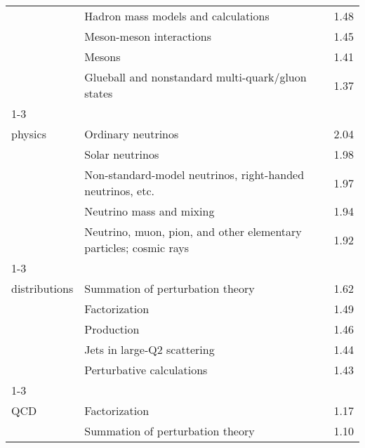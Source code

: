 \begin{longtable}[H]{p{}|p{}|p{}}
                                                               & Hadron mass models and calculations &  1.48 \\
                                                               & Meson-meson interactions &  1.45 \\
                                                               & Mesons &  1.41 \\
                                                               & Glueball and nonstandard multi-quark/gluon states &  1.37 \\
\cline{1-3}
\multirow{5}{*}{\begin{tabular}{l}Neutrino\\ physics\end{tabular}} & Ordinary neutrinos &  2.04 \\
                                                               & Solar neutrinos &  1.98 \\
                                                               & Non-standard-model neutrinos, right-handed neutrinos, etc. &  1.97 \\
                                                               & Neutrino mass and mixing &  1.94 \\
                                                               & Neutrino, muon, pion, and other elementary particles; cosmic rays &  1.92 \\
\cline{1-3}
\multirow{5}{*}{\begin{tabular}{l}Partons\\ distributions\end{tabular}} & Summation of perturbation theory &  1.62 \\
                                                               & Factorization &  1.49 \\
                                                               & Production &  1.46 \\
                                                               & Jets in large-Q2 scattering &  1.44 \\
                                                               & Perturbative calculations &  1.43 \\
\cline{1-3}
\multirow{5}{*}{\begin{tabular}{l}Perturbative\\ QCD\end{tabular}} & Factorization &  1.17 \\
                                                               & Summation of perturbation theory &  1.10 \\

\end{longtable}
